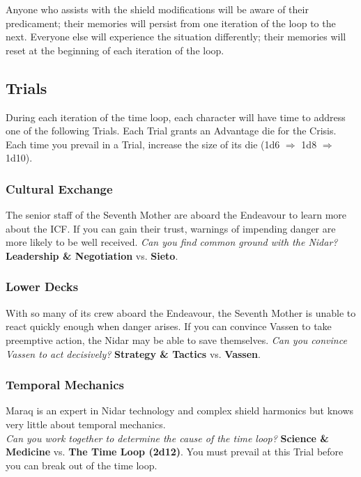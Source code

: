 \documentclass[11pt, a5paper, parskip=half-, DIV=12]{scrartcl}
\begin{document}

Anyone who assists with the shield modifications will be aware of their predicament; their memories will persist from one iteration of the loop to the next.
Everyone else will experience the situation differently; their memories will reset at the beginning of each iteration of the loop.
\newpage

\subsection*{Trials}
During each iteration of the time loop, each character will have time to address one of the following Trials.
Each Trial grants an Advantage die for the Crisis. Each time you prevail in a Trial, increase the size of its die (1d6 $\Longrightarrow$ 1d8 $\Longrightarrow$ 1d10). 

\subsubsection*{Cultural Exchange}
The senior staff of the Seventh Mother
are aboard the Endeavour to learn more about the ICF.
If you can gain their trust, warnings of impending danger are more likely to be well received. \textit{Can you find common ground with the Nidar?} \textbf{Leadership \& Negotiation} vs. \textbf{Sieto}.

\subsubsection*{Lower Decks}
With so many of its crew aboard the Endeavour, the Seventh Mother is unable to react quickly enough when danger arises. If you can convince Vassen to take preemptive action, the Nidar may be able to save themselves. \textit{Can you convince Vassen to act decisively?} \textbf{Strategy \& Tactics} vs. \textbf{Vassen}.

\subsubsection*{Temporal Mechanics}
Maraq is an expert in Nidar technology and complex shield harmonics but knows very little about temporal mechanics.
\\ \textit{Can you work together to determine the cause of the time loop?} \textbf{Science \& Medicine} vs. \textbf{The Time Loop (2d12)}. You must prevail at this Trial before you can break out of the time loop.
\end{document}
